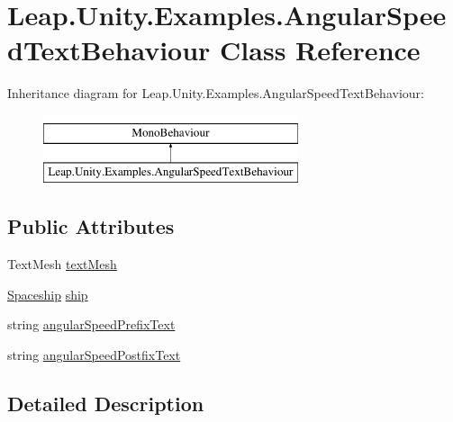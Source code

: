 \hypertarget{class_leap_1_1_unity_1_1_examples_1_1_angular_speed_text_behaviour}{}\section{Leap.\+Unity.\+Examples.\+Angular\+Speed\+Text\+Behaviour Class Reference}
\label{class_leap_1_1_unity_1_1_examples_1_1_angular_speed_text_behaviour}
Inheritance diagram for Leap.\+Unity.\+Examples.\+Angular\+Speed\+Text\+Behaviour\+:\begin{figure}[H]
\begin{center}
\leavevmode
\includegraphics[height=2.000000cm]{class_leap_1_1_unity_1_1_examples_1_1_angular_speed_text_behaviour}
\end{center}
\end{figure}
\subsection*{Public Attributes}
\begin{DoxyCompactItemize}
\item 
Text\+Mesh \mbox{\hyperlink{class_leap_1_1_unity_1_1_examples_1_1_angular_speed_text_behaviour_aa5635b2d39d518f283043b6318dd2cfc}{text\+Mesh}}
\item 
\mbox{\hyperlink{class_leap_1_1_unity_1_1_examples_1_1_spaceship}{Spaceship}} \mbox{\hyperlink{class_leap_1_1_unity_1_1_examples_1_1_angular_speed_text_behaviour_a2b0afaa771bfd89775b99fdba8ebe5d2}{ship}}
\item 
string \mbox{\hyperlink{class_leap_1_1_unity_1_1_examples_1_1_angular_speed_text_behaviour_a3434ce4ba5523f150a038b354193f534}{angular\+Speed\+Prefix\+Text}}
\item 
string \mbox{\hyperlink{class_leap_1_1_unity_1_1_examples_1_1_angular_speed_text_behaviour_a6ee8220d02cab39cdfa0bdbed13bf267}{angular\+Speed\+Postfix\+Text}}
\end{DoxyCompactItemize}


\subsection{Detailed Description}


